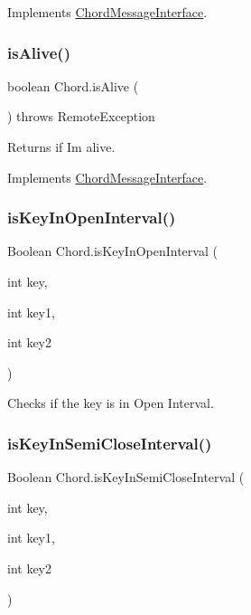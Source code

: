 Implements \hyperlink{interface_chord_message_interface_ab07c08ba6088ef880eaf4ebae8281c51}{Chord\+Message\+Interface}.

\hypertarget{class_chord_a0a677ced19cc0cb5afd2a695977aeb95}{}\label{class_chord_a0a677ced19cc0cb5afd2a695977aeb95} 
\subsubsection{\texorpdfstring{is\+Alive()}{isAlive()}}
{\footnotesize\ttfamily boolean Chord.\+is\+Alive (\begin{DoxyParamCaption}{ }\end{DoxyParamCaption}) throws Remote\+Exception}



Returns if I\textquotesingle{}m alive. 



Implements \hyperlink{interface_chord_message_interface_a8165b3fb53905e657c70b66223197561}{Chord\+Message\+Interface}.

\hypertarget{class_chord_a711a8c4e621940da4c48c1ba60479bd7}{}\label{class_chord_a711a8c4e621940da4c48c1ba60479bd7} 
\subsubsection{\texorpdfstring{is\+Key\+In\+Open\+Interval()}{isKeyInOpenInterval()}}
{\footnotesize\ttfamily Boolean Chord.\+is\+Key\+In\+Open\+Interval (\begin{DoxyParamCaption}\item[{int}]{key,  }\item[{int}]{key1,  }\item[{int}]{key2 }\end{DoxyParamCaption})}



Checks if the key is in Open Interval. 

\hypertarget{class_chord_ad88edc3a01395c31dd0ae209195a2e08}{}\label{class_chord_ad88edc3a01395c31dd0ae209195a2e08} 
\subsubsection{\texorpdfstring{is\+Key\+In\+Semi\+Close\+Interval()}{isKeyInSemiCloseInterval()}}
{\footnotesize\ttfamily Boolean Chord.\+is\+Key\+In\+Semi\+Close\+Interval (\begin{DoxyParamCaption}\item[{int}]{key,  }\item[{int}]{key1,  }\item[{int}]{key2 }\end{DoxyParamCaption})}




